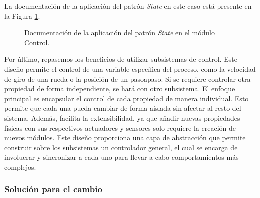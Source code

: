 La documentación de la aplicación del patrón \textit{State} en este caso está presente en la Figura \ref{docStateControl}.

\begin{figure}[H]
\caption{Documentación de la aplicación del patrón \textit{State} en el módulo Control.}
\label{docStateControl}
\end{figure}


Por último, repasemos los beneficios de utilizar subsistemas de control. Este diseño permite el control de una variable específica del proceso, como la velocidad de giro de una rueda o la posición de un \gls{pasoapaso}. Si se requiere controlar otra propiedad de forma independiente, se hará con otro subsistema. El enfoque principal es encapsular el control de cada propiedad de manera individual. Esto permite que cada una pueda cambiar de forma aislada sin afectar al resto del sistema. Además, facilita la extensibilidad, ya que añadir nuevas propiedades físicas con sus respectivos actuadores y sensores solo requiere la creación de nuevos módulos. Este diseño proporciona una capa de abstracción que permite construir sobre los subsistemas un controlador general, el cual se encarga de involucrar y sincronizar a cada uno para llevar a cabo comportamientos más complejos.



\subsubsection*{Solución para el cambio}

